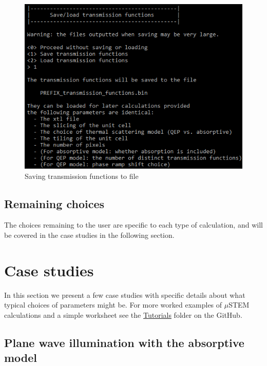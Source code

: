 \documentclass[12pt,a4paper]{article}
\begin{document}
\begin{figure}[!h]
\begin{center}
    \includegraphics[scale=0.75]{figures/save_grates.png}
\caption{Saving transmission functions to file}
\label{fig:save_grates}
\end{center}
\end{figure}

\subsection{Remaining choices}

The choices remaining to the user are specific to each type of calculation, and will be covered in the case studies in the following section.




\section{Case studies}

In this section we present a few case studies with specific details about what typical choices of parameters might be. For more worked examples of $\mu$STEM calculations and a simple worksheet see the \href{https://github.com/HamishGBrown/MuSTEM/tree/master/Tutorial}{Tutorials} folder on the GitHub.

\subsection{Plane wave illumination with the absorptive model}
\label{sec:abs_hrtem}
\end{document}
